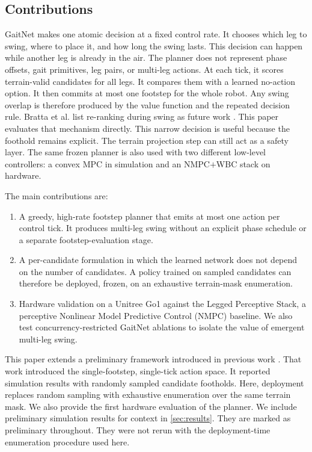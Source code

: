 \subsection{Contributions}

GaitNet makes one atomic decision at a fixed control rate. It chooses
which leg to swing, where to place it, and how long the swing lasts.
This decision can happen while another leg is already in the air. The
planner does not represent phase offsets, gait primitives, leg pairs,
or multi-leg actions. At each tick, it scores terrain-valid candidates
for all legs. It compares them with a learned no-action option. It
then commits at most one footstep for the whole robot. Any swing
overlap is therefore produced by the value function and the repeated
decision rule. Bratta et al. list re-ranking during swing as future
work \cite{bratta_contactnet_2024}. This paper evaluates that
mechanism directly. This narrow decision is useful because the
foothold remains explicit. The terrain projection step can still act
as a safety layer. The same frozen planner is also used with two
different low-level controllers: a convex MPC in simulation and an
NMPC$+$WBC stack on hardware.

The main contributions are:
\begin{enumerate}
  \item A greedy, high-rate footstep planner that emits at most one
    action per control tick. It produces multi-leg swing without an
    explicit phase schedule or a separate footstep-evaluation stage.
  \item A per-candidate formulation in which the learned
    network does not depend on the number of candidates. A policy
    trained on sampled candidates can therefore be deployed, frozen,
    on an exhaustive terrain-mask enumeration.
  \item Hardware validation on a Unitree Go1 against the Legged
    Perceptive Stack, a perceptive Nonlinear Model Predictive Control
    (NMPC) baseline. We also test concurrency-restricted GaitNet
    ablations to isolate the value of emergent multi-leg swing.
\end{enumerate}

This paper extends a preliminary framework introduced in previous
work \cite{Sullivan2025}. That work introduced the single-footstep,
single-tick action space.
It reported simulation results with randomly sampled candidate
footholds. Here, deployment replaces random sampling with
exhaustive enumeration over the same terrain mask. We also provide
the first hardware evaluation of the planner. We include preliminary
simulation results for context in \autoref{sec:results}. They are
marked as preliminary throughout. They were not rerun with the
deployment-time enumeration procedure used here.
